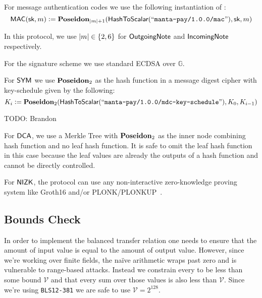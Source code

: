 \begin{definition}
    For message authentication codes we use the following instantiation of \Poseidon{}:
    \[{\textsf{MAC}}({\textsf{sk}}, m) := {\textbf{Poseidon}}_{\left|m\right| + 1}({\textsf{HashToScalar}}({``\texttt{manta-pay/1.0.0/mac}"}), {\textsf{sk}}, m)\]

    In this protocol, we use $|m| \in \set{2, 6}$ for ${\textsf{OutgoingNote}}$ and ${\textsf{IncomingNote}}$ respectively.
\end{definition}

\begin{definition}
    For the signature scheme we use standard ECDSA over $\mathbb{G}$.
\end{definition}

\begin{definition}
    For ${\textsf{SYM}}$ we use ${\textbf{Poseidon}}_2$ as the hash function in a message digest cipher with key-schedule given by the following:
    \[K_i := {\textbf{Poseidon}}_2({\textsf{HashToScalar}}({``\texttt{manta-pay/1.0.0/mdc-key-schedule}"}), K_0, K_{i-1})\]
\end{definition}

\begin{definition}
    TODO: Brandon
\end{definition}

\begin{definition}
    For ${\textsf{DCA}}$, we use a Merkle Tree with ${\textbf{Poseidon}}_2$ as the inner node combining hash function and no leaf hash function. It is safe to omit the leaf hash function in this case because the leaf values are already the outputs of a hash function and cannot be directly controlled.
\end{definition}

\begin{definition} \label{def:concrete-zkp}
    For ${\textsf{NIZK}}$, the protocol can use any non-interactive zero-knowledge proving system like Groth16 \cite{KRRS21USENIX} and/or PLONK/PLONKUP~\cite{plonk,plonkup}. 
\end{definition}

\subsection{\AssetValue{} Bounds Check}

In order to implement the balanced transfer relation one needs to ensure that the amount of input value is equal to the amount of output value. However, since we're working over finite fields, the na\"ive arithmetic wraps past zero and is vulnerable to range-based attacks. Instead we constrain every \AssetValue{} to be less than some bound $\mathcal{V}$ and that every sum over those values is also less than $\mathcal{V}$. Since we're using \texttt{BLS12-381} we are safe to use $\mathcal{V} = 2^{128}$.
